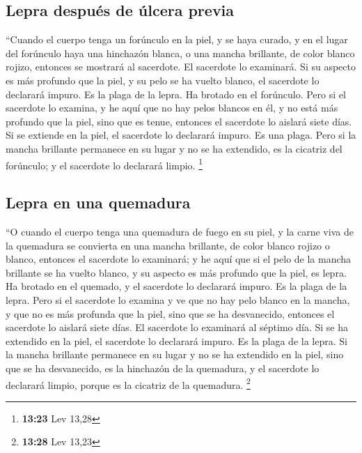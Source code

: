 \begin{paracol}{2}
\hypertarget{lepra-despuuxe9s-de-uxfalcera-previa}{%
\subsection{Lepra después de úlcera
previa}\label{lepra-despuuxe9s-de-uxfalcera-previa}}

 ``Cuando el cuerpo tenga un forúnculo en la piel, y se
haya curado,  y en el lugar del forúnculo haya una
hinchazón blanca, o una mancha brillante, de color blanco rojizo,
entonces se mostrará al sacerdote.  El sacerdote lo
examinará. Si su aspecto es más profundo que la piel, y su pelo se ha
vuelto blanco, el sacerdote lo declarará impuro. Es la plaga de la
lepra. Ha brotado en el forúnculo.  Pero si el sacerdote
lo examina, y he aquí que no hay pelos blancos en él, y no está más
profundo que la piel, sino que es tenue, entonces el sacerdote lo
aislará siete días.  Si se extiende en la piel, el
sacerdote lo declarará impuro. Es una plaga.  Pero si la
mancha brillante permanece en su lugar y no se ha extendido, es la
cicatriz del forúnculo; y el sacerdote lo declarará limpio. \footnote{\textbf{13:23}
  Lev 13,28}

\hypertarget{lepra-en-una-quemadura}{%
\subsection{Lepra en una quemadura}\label{lepra-en-una-quemadura}}

 ``O cuando el cuerpo tenga una quemadura de fuego en su
piel, y la carne viva de la quemadura se convierta en una mancha
brillante, de color blanco rojizo o blanco,  entonces el
sacerdote lo examinará; y he aquí que si el pelo de la mancha brillante
se ha vuelto blanco, y su aspecto es más profundo que la piel, es lepra.
Ha brotado en el quemado, y el sacerdote lo declarará impuro. Es la
plaga de la lepra.  Pero si el sacerdote lo examina y ve
que no hay pelo blanco en la mancha, y que no es más profunda que la
piel, sino que se ha desvanecido, entonces el sacerdote lo aislará siete
días.  El sacerdote lo examinará al séptimo día. Si se ha
extendido en la piel, el sacerdote lo declarará impuro. Es la plaga de
la lepra.  Si la mancha brillante permanece en su lugar y
no se ha extendido en la piel, sino que se ha desvanecido, es la
hinchazón de la quemadura, y el sacerdote lo declarará limpio, porque es
la cicatriz de la quemadura. \footnote{\textbf{13:28} Lev 13,23}


\end{paracol}
